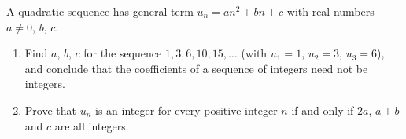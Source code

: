 A quadratic sequence has general term $u_n=an^2+bn+c$ with real numbers $a\ne0$, $b$, $c$.
\begin{enumerate}
\item[(a)] Find $a$, $b$, $c$ for the sequence $1,3,6,10,15,\dots$ (with $u_1=1$, $u_2=3$, $u_3=6$), and conclude that the coefficients of a sequence of integers need not be integers.
\item[(b)] Prove that $u_n$ is an integer for every positive integer $n$ if and only if $2a$, $a+b$ and $c$ are all integers.
\end{enumerate}
